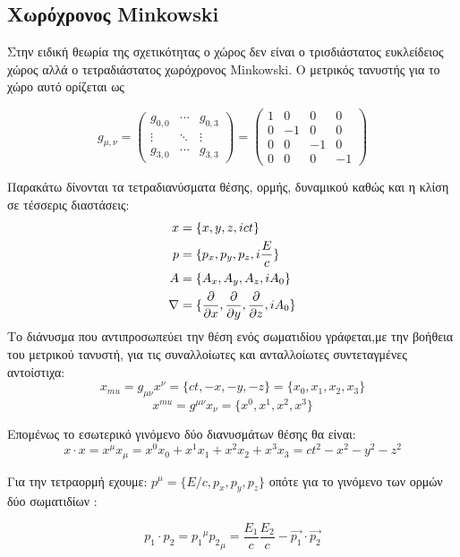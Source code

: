 \subsection{Χωρόχρονος \textlatin{Minkowski}}

Στην ειδική θεωρία της σχετικότητας ο χώρος δεν είναι ο τρισδιάστατος ευκλείδειος χώρος αλλά 
ο τετραδιάστατος χωρόχρονος \textlatin{Minkowski}. Ο μετρικός τανυστής για το χώρο αυτό ορίζεται ως 

\begin{equation}
  g_{\mu,\nu} =
  \begin{pmatrix}
    g_{0,0}  & \cdots & g_{0,3} \\
    \vdots & \ddots & \vdots \\
    g_{3,0}  & \cdots & g_{3,3}
  \end{pmatrix}
  =
  \begin{pmatrix}
    1 & 0 & 0 & 0 \\
    0 & -1 & 0 & 0 \\
    0 & 0 & -1 & 0 \\
    0 & 0 & 0 &-1
  \end{pmatrix}
\end{equation}

Παρακάτω δίνονται τα τετραδιανύσματα θέσης, ορμής, δυναμικού καθώς και η κλίση σε τέσσερις διαστάσεις:
\begin{align*} 
  x &=\{x,y,z,ict\} 
  \\p &=\{p_x,p_y,p_z,i\frac{E}{c}\}
  \\A &=\{A_x,A_y,A_z,iA_0\}
  \\ \nabla &= \{\frac{\partial }{\partial x},\frac{\partial }{\partial y},\frac{\partial }{\partial z},iA_0\}
\end{align*} 
Το διάνυσμα που αντιπροσωπεύει την θέση ενός σωματιδίου γράφεται,με την βοήθεια του μετρικού τανυστή, για τις συναλλοίωτες και ανταλλοίωτες συντεταγμένες αντοίστιχα: 
\[
x_{mu}=g_{\mu \nu} x^\nu= \{ct,-x,-y,-z\}=\{x_0,x_1,x_2,x_3\}
\]
\[
x^{mu}=g^{\mu \nu} x_\nu= \{x^0,x^1,x^2,x^3\}
\]

Επομένως το εσωτερικό γινόμενο δύο διανυσμάτων θέσης θα είναι:
\begin{equation}
  x \cdot x =x^\mu x_\mu =x^0 x_0 + x^1 x_1 + x^2 x_2 +x^3 x_3 = ct^2 -x^2-y^2-z^2  
\end{equation}

Για την τετραορμή εχουμε: $p^\mu =\{E/c,p_x,p_y,p_z\} $ οπότε για το γινόμενο των ορμών δύο σωματιδίων :

\begin{equation}
  p_1 \cdot p_2 = {p_1}^\mu {p_2}_\mu=\frac{E_1}{c} \frac{E_2}{c}-\vec{p_1}\cdot \vec{p_2} 
\end{equation}

